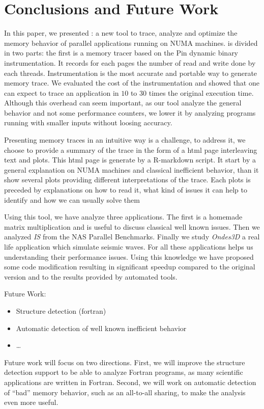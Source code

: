 
\section{Conclusions and Future Work}
\label{sec:concl}

In this paper, we presented \TABARNAC: a new tool to trace, analyze and
optimize the memory behavior of parallel applications running on NUMA
machines. \TABARNAC is divided in two parts: the first is a memory tracer
based on the Pin dynamic binary instrumentation. It records for each pages the
number of read and write done by each threads. Instrumentation is the most
accurate and portable way to generate memory trace. We evaluated the cost of
the instrumentation and showed that one can expect to trace an application in
$10$ to $30$ times the original execution time.
Although this overhead can seem important, as our tool analyze the general
behavior and not some performance counters, we lower it by analyzing programs
running with smaller inputs without loosing accuracy.

Presenting memory traces in an intuitive way is a challenge, to address it, we
choose to provide a summary of the trace in the form of a html page
interleaving text and plots. This html page is generate by a R-markdown
script. It start by a general explanation on NUMA machines and classical
inefficient behavior, than it show several plots providing different
interpretations of the trace. Each plots is preceded by explanations on how to
read it, what kind of issues it can help to identify and how we can usually
solve them

Using this tool, we have analyze three applications. The first is a homemade
matrix multiplication and is useful to discuss classical well known issues.
Then we analyzed \emph{IS} from the NAS Parallel Benchmarks. Finally we study
\emph{Ondes3D} a real life application which simulate seismic waves. For all
these applications \TABARNAC helps us understanding their performance issues.
Using this knowledge we have proposed some code modification resulting in
significant speedup compared to the original version and to the results
provided by automated tools.

Future Work:
\begin{itemize}
    \item Structure detection (fortran)
    \item Automatic detection of well known inefficient behavior
    \item \ldots
\end{itemize}

Future work will focus on two directions. First, we will improve the
structure detection support to be able to analyze Fortran programs, as many
scientific applications are written in Fortran. Second, we will work
on automatic detection of ``bad'' memory behavior, such as an all-to-all sharing,
to make the analysis even more useful.

